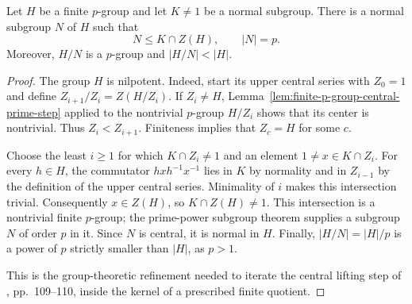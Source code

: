 \begin{lemma}
\label{lem:finite-p-group-central-prime-step-in-kernel}
\leanok
Let $H$ be a finite $p$-group and let $K\ne1$ be a normal subgroup.
There is a normal subgroup $N$ of $H$ such that
\[
 N\le K\cap Z(H),\qquad |N|=p.
\]
Moreover, $H/N$ is a $p$-group and $|H/N|<|H|$.
\end{lemma}

\begin{proof}
The group $H$ is nilpotent. Indeed, start its upper central series
with $Z_0=1$ and define $Z_{i+1}/Z_i=Z(H/Z_i)$.
If $Z_i\ne H$, Lemma~\ref{lem:finite-p-group-central-prime-step}
applied to the nontrivial $p$-group $H/Z_i$ shows that its center
is nontrivial. Thus $Z_i<Z_{i+1}$. Finiteness implies that
$Z_c=H$ for some $c$.

Choose the least $i\ge1$ for which $K\cap Z_i\ne1$ and an element
$1\ne x\in K\cap Z_i$. For every $h\in H$, the commutator
$hxh^{-1}x^{-1}$ lies in $K$ by normality and in $Z_{i-1}$ by
the definition of the upper central series. Minimality of $i$
makes this intersection trivial. Consequently $x\in Z(H)$,
so $K\cap Z(H)\ne1$. This intersection is a nontrivial finite
$p$-group; the prime-power subgroup theorem supplies a subgroup
$N$ of order $p$ in it. Since $N$ is central, it is normal in $H$.
Finally, $|H/N|=|H|/p$ is a power of $p$ strictly smaller than
$|H|$, as $p>1$.

This is the group-theoretic refinement needed to iterate the
central lifting step of \cite{Camina1997}, pp.~109--110,
inside the kernel of a prescribed finite quotient.
\end{proof}

